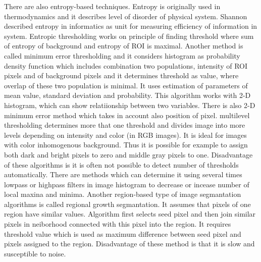         There are also entropy-based techniques. Entropy is originally
        used in thermodynamics and it describes level of disorder of physical system. Shannon described entropy in informatics as unit for measuring efficiency of information in system.
        Entropic thresholding works on principle of finding threshold where sum of entropy of background and entropy of ROI is maximal. Another method is called minimum error thresholding
        and it considers histogram as probability density function which includes combination two populations, intensity of ROI pixels and of background pixels and
        it determines threshold as value, where overlap of these two population is minimal. It uses estimation of parameters of mean value, standard deviation and probability.
        This algorithm works with 2-D histogram, which can show relatiionship between two variables. There is also 2-D minimum error method which takes in account also position of pixel.
        multilevel thresholding determines more that one threshold and divides image into more levels depending on intensity and color (in RGB images). It is ideal for images with color
        inhomogenous background. Thus it is possible for example to assign both dark and bright pixels to zero and middle gray pixels to one. Disadvantage of these algorithms is
        it is often not possible to detect number of thresholds automatically. There are methods which can determine it using several times lowpass or highpass filters in image histogram
        to decrease or incease number of local maxina and minima.
        Another region-based type of image segmantation algorithms is called regional growth segmantation. It assumes that pixels of one region have similar values. Algorithm first selects
        seed pixel and then join similar pixels in neiborhood connected with this pixel into the region. It requires threshold value which is used as maximum difference between seed pixel
        and pixels assigned to the region. Disadvantage of these method is that it is slow and susceptible to noise.~\cite{15, 16, 17, 18}


